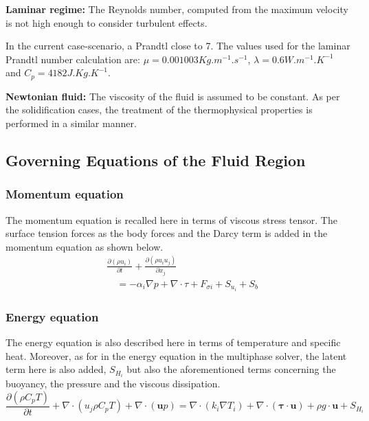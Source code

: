 \textbf{Laminar regime:} The Reynolds number, computed from the maximum velocity is not high enough to consider turbulent effects. 

In the current case-scenario, a Prandtl close to 7. The values used for the laminar Prandtl number calculation are: $\mu = 0.001003 Kg.m^{-1}.s^{-1}$, $\lambda = 0.6 W.m^{-1}.K^{-1}$ and $C_{p}=4182 J.Kg.K^{-1}$.

\textbf{Newtonian fluid:} The viscosity of the fluid is assumed to be constant.
As per the solidification cases, the treatment of the thermophysical properties is performed in a similar manner.

\subsection{Governing Equations of the Fluid Region}
\subsubsection*{Momentum equation}

\setlength{\parindent}{0.5cm} The momentum equation is recalled here in terms of viscous stress tensor. The surface tension forces as the body forces and the Darcy term is added in the momentum equation as shown below.
\begin{equation}
	\label{4.4}
	\begin{aligned}
	&\frac{\partial\left(\rho {u}_{i}\right)}{\partial t}+\frac{\partial\left(\rho {u}_{i} {u}_{j}\right)}{\partial x_{j}} \\
	&\quad=-\alpha_{i} \nabla p+\nabla \cdot \tau +F_{\sigma i}+S_{u_{i}}+S_{b}
	\end{aligned}
\end{equation}
\subsubsection*{Energy equation}

\setlength{\parindent}{0.5cm} The energy equation is also described here in terms of temperature and specific heat. Moreover, as for in the energy equation in the multiphase solver, the latent term here is also added, $S_{H_{i}}$ but also the aforementioned terms concerning the buoyancy, the pressure and the viscous dissipation.
\begin{equation}
	\label{4.5}
	\frac{\partial (\rho C_{p} T)}{\partial t}+\nabla \cdot\left(u_{j}\rho C_{p} T\right) + \nabla \cdot (\textbf{u}p)=\nabla \cdot\left(k_{i} \nabla T_{i}\right) + \nabla \cdot (\boldsymbol{\tau}\cdot\textbf{u})+\rho g \cdot \textbf{u} + S_{H_{i}}
\end{equation}

